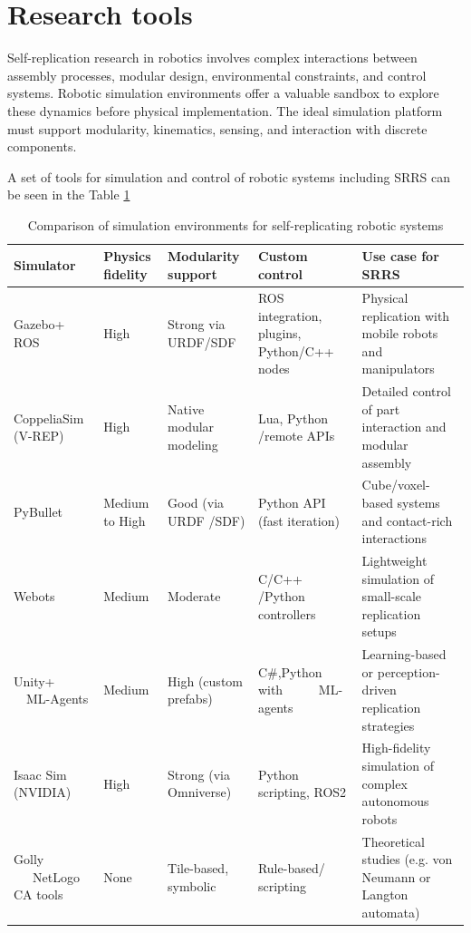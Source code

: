 \section{Research tools}


Self-replication research in robotics involves complex interactions between 
assembly processes, modular design, environmental constraints, 
and control systems. Robotic simulation environments offer a valuable sandbox to 
explore these dynamics before physical implementation. 
The ideal simulation platform must support modularity, kinematics, 
sensing, and interaction with discrete components.

A set of tools for simulation and control of robotic systems including SRRS can be 
seen in the Table \ref{tab:tools}

\begin{table}[h!]
    \centering
    \begin{tabular}{|m{2cm}|m{1.5cm}|m{2cm}|m{2.5cm}|m{5cm}|}
        \hline
        \textbf{Simulator} & \textbf{Physics fidelity} & \textbf{Modularity support} &  \textbf{Custom control} & \textbf{Use case for SRRS} \\
        \hline
        Gazebo+ ROS &
        High &
        Strong via URDF/SDF &
        ROS integration, plugins, Python/C++ nodes &
        Physical replication with mobile robots and manipulators \\
        \hline
        CoppeliaSim (V-REP) &
        High &
        Native modular modeling &
        Lua, Python /remote APIs &
        Detailed control of part interaction and modular assembly \\
        \hline
        PyBullet &
        Medium to High &
        Good (via URDF /SDF) &
        Python API (fast iteration) &
        Cube/voxel-based systems and contact-rich interactions \\
        \hline
        Webots &
        Medium &
        Moderate &
        C/C++ /Python controllers &
        Lightweight simulation of small-scale replication setups \\
        \hline
        Unity+ \ \ ML-Agents &
        Medium &
        High (custom prefabs) &
        C\#,Python with \ \ \ \ \ ML-agents &
        Learning-based or perception-driven replication strategies \\
        \hline
        Isaac Sim (NVIDIA) &
        High &
        Strong (via Omniverse) &
        Python scripting, ROS2 &
        High-fidelity simulation of complex autonomous robots \\
        \hline
        Golly  \ \ \ NetLogo  CA tools &
        None &
        Tile-based, symbolic &
        Rule-based/ scripting &
        Theoretical studies (e.g. von Neumann or Langton automata) \\
        \hline
    \end{tabular}
    \caption{Comparison of simulation environments for self-replicating robotic systems}
    \label{tab:tools}
\end{table}

